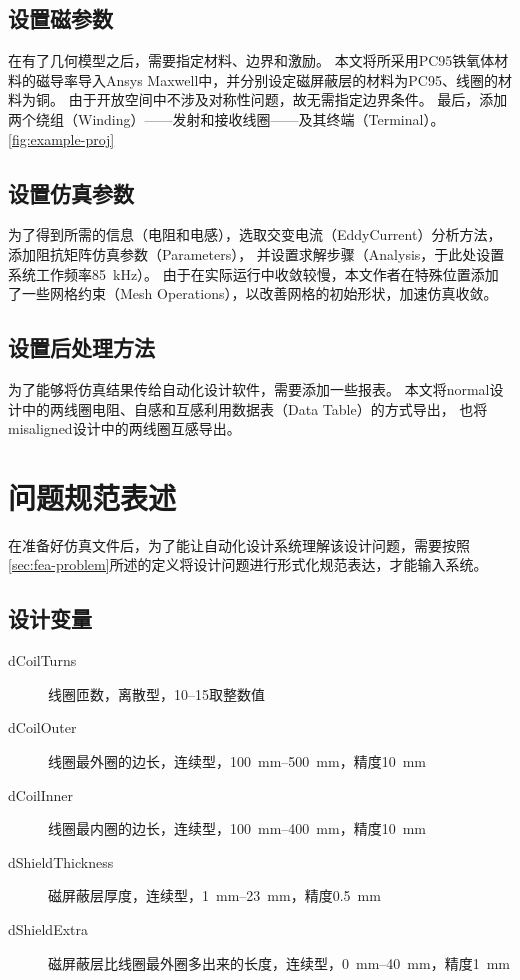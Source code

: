 \documentclass[index]{subfiles}
\begin{document}
\subsection{设置磁参数}
在有了几何模型之后，需要指定材料、边界和激励。
本文将所采用PC95铁氧体材料的磁导率导入Ansys Maxwell中，并分别设定磁屏蔽层的材料为PC95、线圈的材料为铜。
由于开放空间中不涉及对称性问题，故无需指定边界条件。
最后，添加两个绕组（Winding）——发射和接收线圈——及其终端（Terminal）。
\cref{fig:example-proj}

\subsection{设置仿真参数}
为了得到所需的信息（电阻和电感），选取交变电流（EddyCurrent）分析方法，添加阻抗矩阵仿真参数（Parameters），
并设置求解步骤（Analysis，于此处设置系统工作频率\SI{85}{\kilo\hertz}）。
由于在实际运行中收敛较慢，本文作者在特殊位置添加了一些网格约束（Mesh Operations），以改善网格的初始形状，加速仿真收敛。

\subsection{设置后处理方法}
为了能够将仿真结果传给自动化设计软件，需要添加一些报表。
本文将normal设计中的两线圈电阻、自感和互感利用数据表（Data Table）的方式导出，
也将misaligned设计中的两线圈互感导出。

\section{问题规范表述}
在准备好仿真文件后，为了能让自动化设计系统理解该设计问题，需要按照\cref{sec:fea-problem}所述的定义将设计问题进行形式化规范表达，才能输入系统。

\subsection{设计变量}
\begin{description}
  \item[dCoilTurns] 线圈匝数，离散型，\numrange{10}{15}取整数值
  \item[dCoilOuter] 线圈最外圈的边长，连续型，\SIrange{100}{500}{\milli\metre}，精度\SI{10}{\milli\metre}
  \item[dCoilInner] 线圈最内圈的边长，连续型，\SIrange{100}{400}{\milli\metre}，精度\SI{10}{\milli\metre}
  \item[dShieldThickness] 磁屏蔽层厚度，连续型，\SIrange{1}{23}{\milli\metre}，精度\SI{0.5}{\milli\metre}
  \item[dShieldExtra] 磁屏蔽层比线圈最外圈多出来的长度，连续型，\SIrange{0}{40}{\milli\metre}，精度\SI{1}{\milli\metre}
\end{description}
\end{document}

